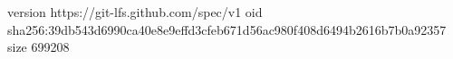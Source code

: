 version https://git-lfs.github.com/spec/v1
oid sha256:39db543d6990ca40e8e9effd3cfeb671d56ac980f408d6494b2616b7b0a92357
size 699208
